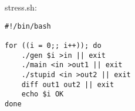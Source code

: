 stress.sh:
\begin{verbatim}
#!/bin/bash

for ((i = 0;; i++)); do
	./gen $i >in || exit
	./main <in >out1 || exit
	./stupid <in >out2 || exit
	diff out1 out2 || exit
	echo $i OK
done
\end{verbatim}
